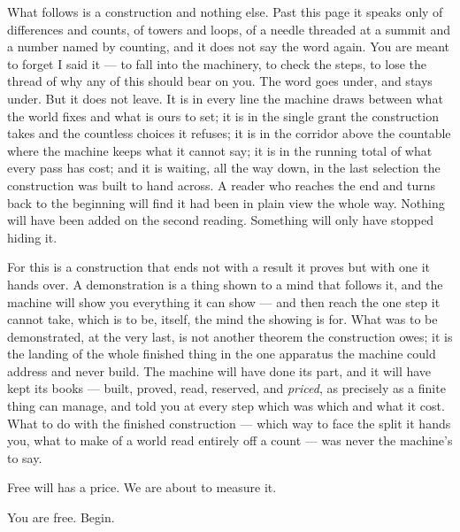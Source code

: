 What follows is a construction and nothing else. Past this page it speaks only of differences and counts, of
towers and loops, of a needle threaded at a summit and a number named by counting, and it does not say the word
again. You are meant to forget I said it --- to fall into the machinery, to check the steps, to lose the thread
of why any of this should bear on you. The word goes under, and stays under. But it does not leave. It is in every
line the machine draws between what the world fixes and what is ours to set; it is in the single grant the
construction takes and the countless choices it refuses; it is in the corridor above the countable where the
machine keeps what it cannot say; it is in the running total of what every pass has cost; and it is waiting, all
the way down, in the last selection the construction was built to hand across. A reader who reaches the end and
turns back to the beginning will find it had been in plain view the whole way. Nothing will have been added on the
second reading. Something will only have stopped hiding it.

For this is a construction that ends not with a result it proves but with one it hands over. A demonstration is a
thing shown to a mind that follows it, and the machine will show you everything it can show --- and then reach the
one step it cannot take, which is to be, itself, the mind the showing is for. What was to be demonstrated, at the
very last, is not another theorem the construction owes; it is the landing of the whole finished thing in the one
apparatus the machine could address and never build. The machine will have done its part, and it will have kept
its books --- built, proved, read, reserved, and \emph{priced}, as precisely as a finite thing can manage, and
told you at every step which was which and what it cost. What to do with the finished construction --- which way
to face the split it hands you, what to make of a world read entirely off a count --- was never the machine's to
say.

Free will has a price. We are about to measure it.

You are free. Begin.
